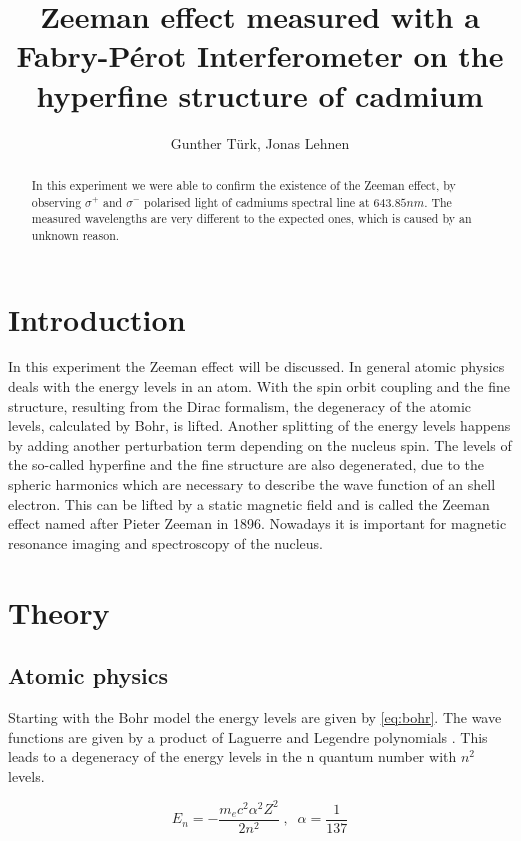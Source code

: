 \documentclass[]{article}
\title{Zeeman effect measured with a Fabry-Pérot Interferometer on the hyperfine structure of cadmium}
\author{Gunther T\"urk, Jonas Lehnen}
\begin{document}
\maketitle
\begin{abstract}
In this experiment we were able to confirm the existence of the Zeeman effect, by observing $\sigma^+$ and $\sigma^-$ polarised light of cadmiums spectral line at $643.85nm$. The measured wavelengths are very different to the expected ones, which is caused by an unknown reason.
\end{abstract}

\newpage
\tableofcontents

\newpage
\section{Introduction}
In this experiment the Zeeman effect will be discussed. In general atomic physics deals with the energy levels in an atom. With the spin orbit coupling and the fine structure, resulting from the Dirac formalism, the degeneracy of the atomic levels, calculated by Bohr, is lifted. Another splitting of the energy levels happens by adding another perturbation term depending on the nucleus spin. The levels of the so-called hyperfine and the fine structure are also degenerated, due to the spheric harmonics which are necessary to describe the wave function of an shell electron. This can be lifted by a static magnetic field and is called the Zeeman effect named after Pieter Zeeman in 1896.
Nowadays it is important for magnetic resonance imaging and spectroscopy of the nucleus.



\section{Theory}
\subsection{Atomic physics}
Starting with the Bohr model the energy levels are given by \autoref{eq:bohr}. The wave functions are given by a product of Laguerre and Legendre polynomials \cite{dem3}. This leads to a degeneracy of the energy levels in the n quantum number with $n^2$ levels. 

\begin{equation}
E_n = -\frac{m_ec^2\alpha^2Z^2}{2n^2} \;,\;\; \alpha=\frac{1}{137}
\label{eq:bohr}
\end{equation}
\end{document}
